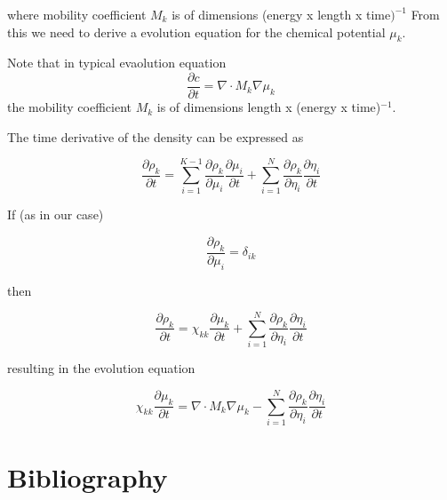 \documentclass[11pt]{article}
\begin{document}
where mobility coefficient \(M_k\) is of dimensions (energy x length x time\()^{-1}\)
From this we need to derive a evolution equation for the chemical potential \(\mu_k\).

Note that in typical evaolution equation
$$
\frac{\partial c}{\partial t} = \nabla \cdot M_k \nabla \mu_k
$$
the mobility coefficient \(M_k\) is of dimensions length x (energy x time)\(^{-1}\).

The time derivative of the density can be expressed as

$$
\frac{\partial \rho_k}{\partial t} = \sum_{i=1}^{K-1} \frac{\partial \rho_k}{\partial \mu_i} \frac{\partial \mu_i}{\partial t} + \sum_{i=1}^{N} \frac{\partial \rho_k}{\partial \eta_i} \frac{\partial \eta_i}{\partial t}
$$

If (as in our case)

$$
\frac{\partial \rho_k}{\partial \mu_i} = \delta_{ik}
$$

then

$$
\frac{\partial \rho_k}{\partial t} = \chi_{kk} \frac{\partial \mu_k}{\partial t} + \sum_{i=1}^{N} \frac{\partial \rho_k}{\partial \eta_i} \frac{\partial \eta_i}{\partial t}
$$

resulting in the evolution equation

$$
\chi_{kk} \frac{\partial \mu_k}{\partial t} = \nabla \cdot M_k \nabla \mu_k - \sum_{i=1}^N \frac{\partial \rho_k}{\partial \eta_i} \frac{\partial \eta_i}{\partial t}
$$



\section{Bibliography}
\label{sec:org5518afe}
\end{document}
